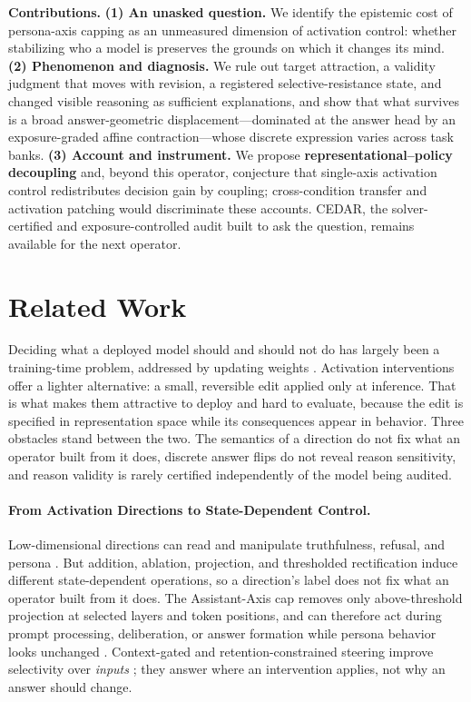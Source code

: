 \documentclass[letterpaper]{article} %
\begin{document}
\noindent\textbf{Contributions.}
\textbf{(1) An unasked question.} We identify the epistemic cost of persona-axis capping as an unmeasured dimension of activation control: whether stabilizing who a model is preserves the grounds on which it changes its mind.
\noindent\textbf{(2) Phenomenon and diagnosis.} We rule out target attraction, a validity judgment that moves with revision, a registered selective-resistance state, and changed visible reasoning as sufficient explanations, and show that what survives is a broad answer-geometric displacement---dominated at the answer head by an exposure-graded affine contraction---whose discrete expression varies across task banks.
\noindent\textbf{(3) Account and instrument.} We propose \textbf{representational--policy decoupling} and, beyond this operator, conjecture that single-axis activation control redistributes decision gain by coupling; cross-condition transfer and activation patching would discriminate these accounts. CEDAR, the solver-certified and exposure-controlled audit built to ask the question, remains available for the next operator.

\section{Related Work}
\label{sec:background}

Deciding what a deployed model should and should not do has largely been a training-time problem, addressed by updating weights \citep{ouyang2022training,rafailov2023direct}. Activation interventions offer a lighter alternative: a small, reversible edit applied only at inference. That is what makes them attractive to deploy and hard to evaluate, because the edit is specified in representation space while its consequences appear in behavior. Three obstacles stand between the two. The semantics of a direction do not fix what an operator built from it does, discrete answer flips do not reveal reason sensitivity, and reason validity is rarely certified independently of the model being audited.

\paragraph{From Activation Directions to State-Dependent Control.}

Low-dimensional directions can read and manipulate truthfulness, refusal, and persona \citep{zou2023representation,turner2023steering,li2023inference,rimsky2024steering,arditi2024refusal}. But addition, ablation, projection, and thresholded rectification induce different state-dependent operations, so a direction's label does not fix what an operator built from it does. The Assistant-Axis cap removes only above-threshold projection at selected layers and token positions, and can therefore act during prompt processing, deliberation, or answer formation while persona behavior looks unchanged \citep{lu2026assistant}. Context-gated and retention-constrained steering improve selectivity over \emph{inputs} \citep{lee2025programming,stickland2024steering}; they answer where an intervention applies, not why an answer should change.
\end{document}
